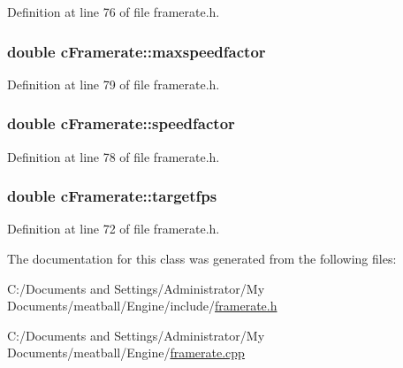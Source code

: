 Definition at line 76 of file framerate.\-h.

\hypertarget{classc_framerate_ad1bca95d162390adcab7352edf2b839c}{
\subsubsection[{maxspeedfactor}]{\setlength{\rightskip}{0pt plus 5cm}double c\-Framerate\-::maxspeedfactor}}\label{classc_framerate_ad1bca95d162390adcab7352edf2b839c}


Definition at line 79 of file framerate.\-h.

\hypertarget{classc_framerate_a5852e9eaeadefcd0da9d0e5c9ec63980}{
\subsubsection[{speedfactor}]{\setlength{\rightskip}{0pt plus 5cm}double c\-Framerate\-::speedfactor}}\label{classc_framerate_a5852e9eaeadefcd0da9d0e5c9ec63980}


Definition at line 78 of file framerate.\-h.

\hypertarget{classc_framerate_af5658ae10ecbaecab7b26251bfc5603b}{
\subsubsection[{targetfps}]{\setlength{\rightskip}{0pt plus 5cm}double c\-Framerate\-::targetfps}}\label{classc_framerate_af5658ae10ecbaecab7b26251bfc5603b}


Definition at line 72 of file framerate.\-h.



The documentation for this class was generated from the following files\-:\begin{DoxyCompactItemize}
\item 
C\-:/\-Documents and Settings/\-Administrator/\-My Documents/meatball/\-Engine/include/\hyperlink{framerate_8h}{framerate.\-h}\item 
C\-:/\-Documents and Settings/\-Administrator/\-My Documents/meatball/\-Engine/\hyperlink{framerate_8cpp}{framerate.\-cpp}\end{DoxyCompactItemize}
